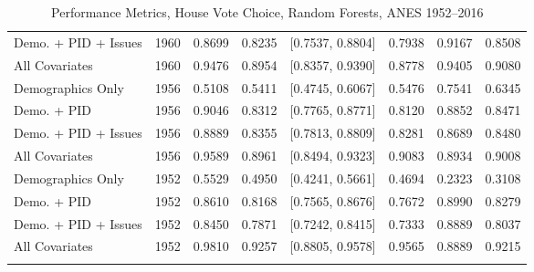 \begin{longtable}{lrrrlrrr}
  Demo. + PID + Issues & 1960 & 0.8699 & 0.8235 & [0.7537, 0.8804] & 0.7938 & 0.9167 & 0.8508 \\ 
  All Covariates & 1960 & 0.9476 & 0.8954 & [0.8357, 0.9390] & 0.8778 & 0.9405 & 0.9080 \\ 
  Demographics Only & 1956 & 0.5108 & 0.5411 & [0.4745, 0.6067] & 0.5476 & 0.7541 & 0.6345 \\ 
  Demo. + PID & 1956 & 0.9046 & 0.8312 & [0.7765, 0.8771] & 0.8120 & 0.8852 & 0.8471 \\ 
  Demo. + PID + Issues & 1956 & 0.8889 & 0.8355 & [0.7813, 0.8809] & 0.8281 & 0.8689 & 0.8480 \\ 
  All Covariates & 1956 & 0.9589 & 0.8961 & [0.8494, 0.9323] & 0.9083 & 0.8934 & 0.9008 \\ 
  Demographics Only & 1952 & 0.5529 & 0.4950 & [0.4241, 0.5661] & 0.4694 & 0.2323 & 0.3108 \\ 
  Demo. + PID & 1952 & 0.8610 & 0.8168 & [0.7565, 0.8676] & 0.7672 & 0.8990 & 0.8279 \\ 
  Demo. + PID + Issues & 1952 & 0.8450 & 0.7871 & [0.7242, 0.8415] & 0.7333 & 0.8889 & 0.8037 \\ 
  All Covariates & 1952 & 0.9810 & 0.9257 & [0.8805, 0.9578] & 0.9565 & 0.8889 & 0.9215 \\ 
   \bottomrule
\caption{Performance Metrics, House Vote Choice, Random Forests, ANES 1952--2016} 
\label{tab:ANES_house_rf}
\end{longtable}
